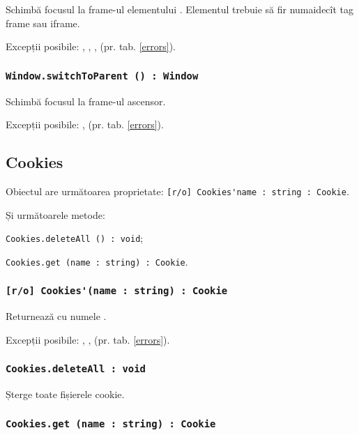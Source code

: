 Schimbă focusul la frame-ul elementului . Elementul trebuie să fir numaidecît tag frame sau iframe.

Excepții posibile: , , ,  (pr. tab. \ref{errors}).

\subsubsection{\lstinline|Window.switchToParent () : Window|}

Schimbă focusul la frame-ul ascensor.

Excepții posibile: ,  (pr. tab. \ref{errors}).

\subsection{{\color{orange} Cookies}}

Obiectul \cookies{} are următoarea proprietate: \lstinline|[r/o] Cookies'name : string : Cookie|.

Și următoarele metode: 
\begin{icItems}
	\item \lstinline|Cookies.deleteAll () : void|;
	\item \lstinline|Cookies.get (name : string) : Cookie|.
\end{icItems}

\subsubsection{\lstinline|[r/o] Cookies'(name : string) : Cookie|}

Returnează \cookie{} cu numele .

Excepții posibile: , ,  (pr. tab. \ref{errors}).

\subsubsection{\lstinline|Cookies.deleteAll : void|}

Șterge toate fișierele cookie.

\subsubsection{\lstinline|Cookies.get (name : string) : Cookie|}

